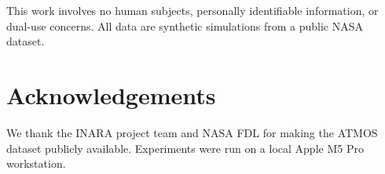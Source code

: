 \documentclass[11pt]{article}
\begin{document}
This work involves no human subjects, personally identifiable information, or
dual-use concerns. All data are synthetic simulations from a public NASA dataset.


\section*{Acknowledgements}

We thank the INARA project team and NASA FDL for making the ATMOS dataset
publicly available. Experiments were run on a local Apple M5 Pro workstation.




\end{document}
